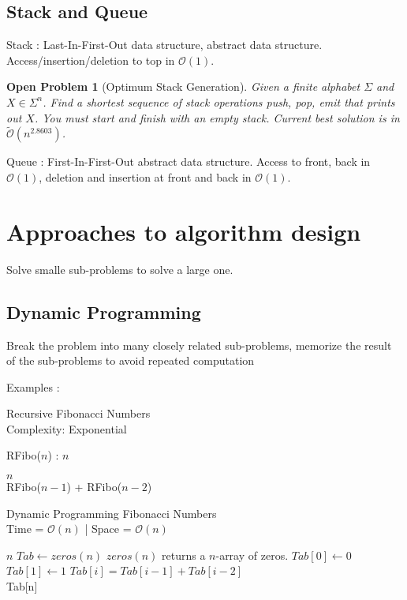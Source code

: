 \documentclass{cours}
\newtheorem{openpb}{Open Problem}
\begin{document}
\subsection{Stack and Queue}
Stack : Last-In-First-Out data structure, abstract data structure. Access/insertion/deletion to top in $\mathcal{O}(1)$.

\begin{openpb}[Optimum Stack Generation]
    Given a finite alphabet $\Sigma$ and $X \in \Sigma^{n}$. Find a shortest sequence of stack operations push, pop, emit that prints out $X$. You must start and finish with an empty stack.
    Current best solution is in $\tilde{\mathcal{O}}(n^{2.8603})$.
\end{openpb}

Queue : First-In-First-Out abstract data structure. Access to front, back in $\mathcal{O}(1)$, deletion and insertion at front and back in $\mathcal{O}(1)$.

\section{Approaches to algorithm design}
Solve smalle sub-problems to solve a large one.

\subsection{Dynamic Programming}
Break the problem into many closely related sub-problems, memorize the result of the sub-problems to avoid repeated computation

Examples : 
\begin{algorithm}
    \caption{Recursive Fibonacci Numbers \\ Complexity: Exponential}
    \begin{algorithmic}
        \State RFibo($n$) :
        \Input
        $ n$
        \EndInput

            \Return $n$
        \EndIf\\
        \Return RFibo($n-1$) + RFibo($n-2$)
    \end{algorithmic}        
\end{algorithm}

\begin{algorithm}
    \caption{Dynamic Programming Fibonacci Numbers \\ Time = $\mathcal{O}(n)$ | Space = $\mathcal{O}(n)$}
    \begin{algorithmic}
        \Input
        $ n$
        \EndInput
        \State $Tab \gets zeros(n)$ \Comment $zeros(n)$ returns a $n$-array of zeros.
        \State $Tab[0] \gets 0$
        \State $Tab[1] \gets 1$
            \State $Tab[i] = Tab[i-1] + Tab[i-2]$
        \EndFor\\
        \Return Tab[n]
    \end{algorithmic}        
\end{algorithm}
\end{document}

